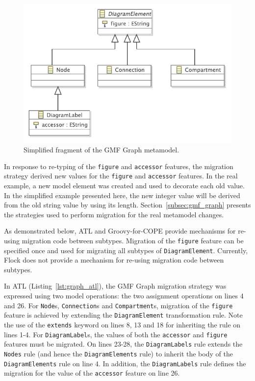 \begin{figure}[htbp]
  \centering
  \includegraphics[scale=0.75]{6.Evaluation/images/subtyping.pdf}
  \caption{Simplified fragment of the GMF Graph metamodel.}
  \label{fig:subtyping}
\end{figure}

In response to re-typing of the \texttt{figure} and \texttt{accessor} features, the
migration strategy derived new values for the \texttt{figure} and \texttt{accessor} features. In the real example, a new model element was created and used to decorate \cite{gamma95patterns} each old value. In the simplified example presented here, the new integer value will be derived from the old string value by using its length. Section~\ref{subsec:gmf_graph} presents the strategies used to perform migration for the real metamodel changes.

As demonstrated below, ATL and Groovy-for-COPE provide mechanisms for re-using migration code between subtypes. Migration of the \texttt{figure} feature can be specified once and used for migrating all subtypes of \texttt{Di\-ag\-ramEl\-em\-e\-nt}. Currently, Flock does not provide a mechanism for re-using migration code between subtypes.

In ATL (Listing~\ref{lst:graph_atl}), the GMF Graph migration strategy was expressed using two model operations: the two assignment operations on lines 4 and 26. For \texttt{Node}s, \texttt{Connection}s and \texttt{Compartment}s, migration of the \texttt{figure} feature is achieved by extending the \texttt{DiagramElement} transformation rule. Note the use of the \texttt{extends} keyword on lines 8, 13 and 18 for inheriting the rule on lines 1-4. For \texttt{DiagramLabel}s, the values of both the \texttt{accessor} and \texttt{figure} features must be migrated. On lines 23-28, the \texttt{DiagramLabels} rule extends the \texttt{Nodes} rule (and hence the \texttt{DiagramElements} rule) to inherit the body of the \texttt{DiagramElements} rule on line 4. In addition, the \texttt{DiagramLabels} rule defines the migration for the value of the \texttt{accessor} feature on line 26.

